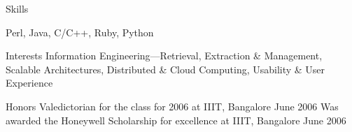 \documentclass{resume}
\renewcommand{\labelcitem}{}
\begin{document}
\begin{category}{Skills}

     Perl, Java, C/C++, Ruby, Python


\end{category}


\begin{category}{Interests}
	\citemnobullet Information Engineering---Retrieval, Extraction \& Management, Scalable Architectures, Distributed \& Cloud Computing, Usability \& User Experience
\end{category}


\renewcommand{\labelcitem}{$\diamond$}


\begin{category}{Honors}
    \citembullet Valedictorian for the class for 2006 at IIIT, Bangalore {\period June 2006}
    \citembullet Was awarded the Honeywell Scholarship for excellence at IIIT, Bangalore {\period June 2006}
\end{category}
\end{document}
